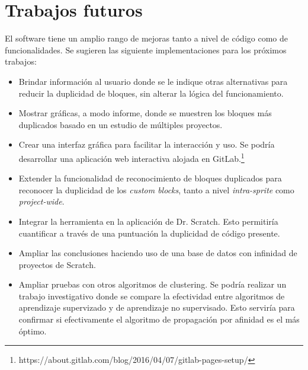 \documentclass[a4paper, 12pt]{book}
\begin{document}
\section{Trabajos futuros}
\label{sec:trabajos_futuros}

El software tiene un amplio rango de mejoras tanto a nivel de código como de funcionalidades. Se sugieren las siguiente implementaciones para los próximos trabajos:

\begin{itemize}
\item Brindar información al usuario donde se le indique otras alternativas para reducir la duplicidad de bloques, sin alterar la lógica del funcionamiento.
\item Mostrar gráficas, a modo informe, donde se muestren los bloques más duplicados basado en un estudio de múltiples proyectos.
\item Crear una interfaz gráfica para facilitar la interacción y uso. Se podría desarrollar una aplicación web interactiva alojada en GitLab.\footnote{https://about.gitlab.com/blog/2016/04/07/gitlab-pages-setup/}
\item Extender la funcionalidad de reconocimiento de bloques duplicados para reconocer la duplicidad de los \textit{custom blocks}, tanto a nivel \textit{intra-sprite} como \textit{project-wide}.
\item Integrar la herramienta en la aplicación de Dr. Scratch. Esto permitiría cuantificar a través de una puntuación la duplicidad de código presente.
\item Ampliar las conclusiones haciendo uso de una base de datos con infinidad de proyectos de Scratch.
\item Ampliar pruebas con otros algoritmos de clustering. Se podría realizar un trabajo investigativo donde se compare la efectividad entre algoritmos de aprendizaje supervizado y de aprendizaje no supervisado. Esto serviría para confirmar si efectivamente el algoritmo de propagación por afinidad es el más óptimo.
\end{itemize}




\end{document}
